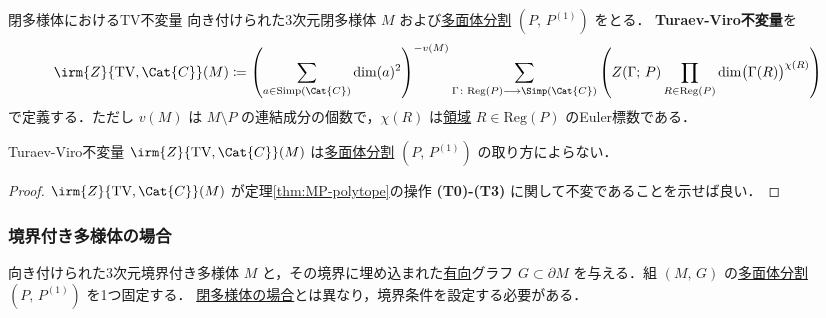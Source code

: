 \documentclass[TQFT_main]{subfiles}
\begin{document}
\begin{mydef}[label=def:TV-closed]{閉多様体におけるTV不変量}
    向き付けられた3次元閉多様体 $M$ および\hyperref[def:polytope-decomp]{多面体分割} $(P,\, P^{(1)})$ をとる．
    \textbf{Turaev-Viro不変量}を
    \begin{align}
        \irm{Z}{\text{TV},\Cat{C}}(M) \coloneqq \left( \sum_{a \in \mathrm{Simp}(\Cat{C})} \dim(a)^2\right)^{-v(M)} \sum_{\Gamma \colon \mathrm{Reg}(P) \lto \Simp(\Cat{C})} \left(Z(\Gamma;\, P) \prod_{R \in \mathrm{Reg}(P)} \dim \bigl( \Gamma(R) \bigr)^{\chi(R)}\right)
    \end{align}
    で定義する．ただし $v(M)$ は $M \setminus P$ の連結成分の個数で，$\chi (R)$ は\hyperref[def:polyhedron]{領域} $R \in \mathrm{Reg}(P)$ のEuler標数である．
\end{mydef}

\begin{mytheo}[label=thm:TV-closed]{}
    Turaev-Viro不変量 $\irm{Z}{\text{TV},\Cat{C}}(M)$ は\hyperref[def:polytope-decomp]{多面体分割} $(P,\, P^{(1)})$ の取り方によらない．
\end{mytheo}

\begin{proof}
    $\irm{Z}{\text{TV},\Cat{C}}(M)$ が定理\ref{thm:MP-polytope}の操作 \textsf{\textbf{(T0)-(T3)}} に関して不変であることを示せば良い．
\end{proof}

\subsubsection{境界付き多様体の場合}

向き付けられた3次元境界付き多様体 $M$ と，その境界に埋め込まれた\underline{有向}グラフ $G \subset \partial M$ を与える．組 $(M,\, G)$ の\hyperref[def:polytope-decomp]{多面体分割} $(P,\, P^{(1)})$ を1つ固定する．
\hyperref[def:TV-closed]{閉多様体の場合}とは異なり，境界条件を設定する必要がある．
\end{document}
